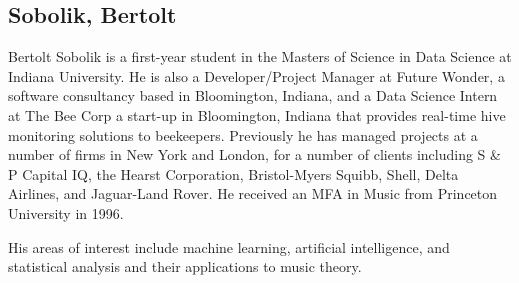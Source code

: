 \subsection{Sobolik, Bertolt}

Bertolt Sobolik is a first-year student in the Masters of Science in
Data Science at Indiana University. He is also a Developer/Project
Manager at Future Wonder, a software consultancy based in Bloomington,
Indiana, and a Data Science Intern at The Bee Corp a start-up in
Bloomington, Indiana that provides real-time hive monitoring solutions
to beekeepers. Previously he has managed projects at a number of firms
in New York and London, for a number of clients including S \& P Capital
IQ, the Hearst Corporation, Bristol-Myers Squibb, Shell, Delta
Airlines, and Jaguar-Land Rover. He received an MFA in Music from
Princeton University in 1996.

His areas of interest include machine learning, artificial
intelligence, and statistical analysis and their applications to music
theory.
